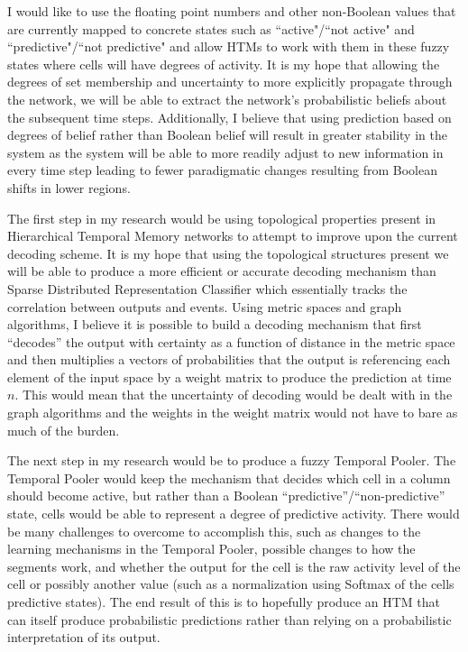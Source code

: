 \documentclass[fleqn,minimal]{article}
\begin{document}
	I would like to use the floating point numbers and other non-Boolean values that are currently mapped to concrete states such as ``active"/``not active" and ``predictive"/``not predictive" and allow HTMs to work with them in these fuzzy states where cells will have degrees of activity. It is my hope that allowing the degrees of set membership and uncertainty to more explicitly propagate through the network, we will be able to extract the network's probabilistic beliefs about the subsequent time steps. Additionally, I believe that using prediction based on degrees of belief rather than Boolean belief will result in greater stability in the system as the system will be able to more readily adjust to new information in every time step leading to fewer paradigmatic changes resulting from Boolean shifts in lower regions.
	
	The first step in my research would be using topological properties present in Hierarchical Temporal Memory networks to attempt to improve upon the current decoding scheme. It is my hope that using the topological structures present we will be able to produce a more efficient or accurate decoding mechanism than Sparse Distributed Representation Classifier which essentially tracks the correlation between outputs and events. Using metric spaces and graph algorithms, I believe it is possible to build a decoding mechanism that first ``decodes'' the output with certainty as a function of distance in the metric space and then multiplies a vectors of probabilities that the output is referencing each element of the input space by a weight matrix to produce the prediction at time $n$. This would mean that the uncertainty of decoding would be dealt with in the graph algorithms and the weights in the weight matrix would not have to bare as much of the burden.
	
	The next step in my research would be to produce a fuzzy Temporal Pooler. The Temporal Pooler would keep the mechanism that decides which cell in a column should become active, but rather than a Boolean ``predictive''/``non-predictive'' state, cells would be able to represent a degree of predictive activity. There would be many challenges to overcome to accomplish this, such as changes to the learning mechanisms in the Temporal Pooler, possible changes to how the segments work, and whether the output for the cell is the raw activity level of the cell or possibly another value (such as a normalization using Softmax of the cells predictive states). The end result of this is to hopefully produce an HTM that can itself produce probabilistic predictions rather than relying on a probabilistic interpretation of its output.
	
\end{document}
